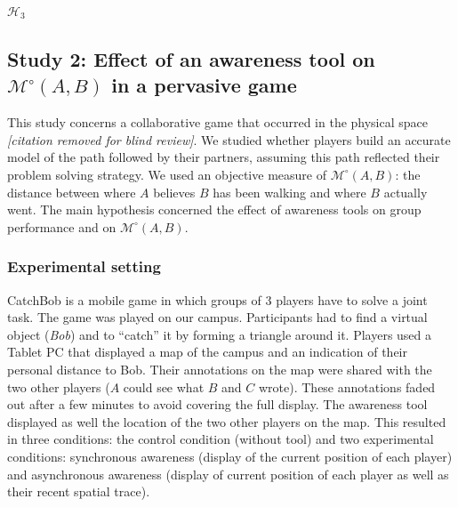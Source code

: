 \documentclass[natbib]{svjour3}
\newcommand{\gModel}[2]{{$\mathcal{M}^{\circ}(#1, #2)$}}
\begin{document}
$\mathcal{H}_{3}$



\subsection{{\bf Study 2}: Effect of an awareness tool on \gModel{A}{B}  in a pervasive
game}

This study concerns a collaborative game that occurred in the physical
space \textit{[citation removed for blind review]}. We studied whether players build an accurate
model of the path followed by their partners, assuming this path reflected their
problem solving strategy. We used an objective measure of \gModel{A}{B}: the
distance between where $A$ believes $B$ has been walking and where $B$ actually went.
The main hypothesis concerned the effect of awareness tools on group performance
and on \gModel{A}{B}. 

\subsubsection*{Experimental setting}

{\sc CatchBob} is a mobile game in which groups of 3 players have to solve a
joint task. The game was played on our campus. Participants had to find a
virtual object (\emph{Bob}) and to ``catch'' it by forming a triangle around it.
Players used a Tablet PC that displayed a map of the campus and an indication of
their personal distance to Bob. Their annotations on the map were shared with
the two other players ($A$ could see what $B$ and $C$ wrote). These annotations
faded out after a few minutes to avoid covering the full display. The awareness
tool displayed as well the location of the two other players on the map. This
resulted in three conditions: the control condition (without tool) and two
experimental conditions: synchronous awareness (display of the current position
of each player) and asynchronous awareness (display of current position of each
player as well as their recent spatial trace).
\end{document}

